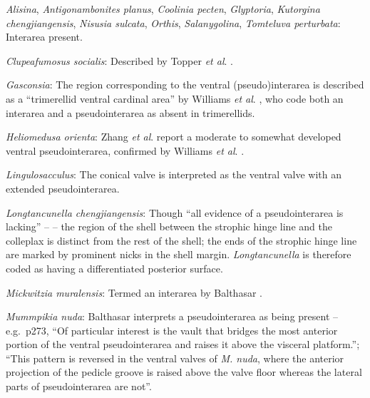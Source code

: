 \documentclass[openany]{book}
\theoremstyle{definition}
\theoremstyle{definition}
\theoremstyle{definition}
\theoremstyle{remark}
\begin{document}
\hypertarget{Alisina-coding-37}{}
\emph{Alisina}, \emph{Antigonambonites planus}, \emph{Coolinia pecten},
\emph{Glyptoria}, \emph{Kutorgina chengjiangensis}, \emph{Nisusia
sulcata}, \emph{Orthis}, \emph{Salanygolina}, \emph{Tomteluva
perturbata}: Interarea present.

\hypertarget{Clupeafumosus_socialis-coding-37}{}
\emph{Clupeafumosus socialis}: Described by Topper \emph{et al}.
\citeyearpar{Topper2013Reappraisalof}.

\hypertarget{Gasconsia-coding-37}{}
\emph{Gasconsia}: The region corresponding to the ventral
(pseudo)interarea is described as a ``trimerellid ventral cardinal
area'' by Williams \emph{et al}.
\citeyearpar[p.162]{Williams2000LinguliformeaCraniiformea}, who code
both an interarea and a pseudointerarea as absent in trimerellids.

\hypertarget{Heliomedusa_orienta-coding-37}{}
\emph{Heliomedusa orienta}: Zhang \emph{et al}.
\citeyearpar{Zhang2009Architectureand} report a moderate to somewhat
developed ventral pseudointerarea, confirmed by Williams \emph{et al}.
\citeyearpar{Williams2007Supplement}.

\hypertarget{Lingulosacculus-coding-37}{}
\emph{Lingulosacculus}: The conical valve is interpreted as the ventral
valve with an extended pseudointerarea.

\hypertarget{Longtancunella_chengjiangensis-coding-37}{}
\emph{Longtancunella chengjiangensis}: Though ``all evidence of a
pseudointerarea is lacking'' -- \citet{Zhang2011Theexceptionally} -- the
region of the shell between the strophic hinge line and the colleplax
\citep[fig. 2 in][]{Zhang2011Theexceptionally} is distinct from the rest
of the shell; the ends of the strophic hinge line are marked by
prominent nicks in the shell margin. \emph{Longtancunella} is therefore
coded as having a differentiated posterior surface.

\hypertarget{Mickwitzia_muralensis-coding-37}{}
\emph{Mickwitzia muralensis}: Termed an interarea by Balthasar
\citeyearpar{Balthasar2004Shellstructure}.

\hypertarget{Mummpikia_nuda-coding-37}{}
\emph{Mummpikia nuda}: Balthasar \citeyearpar{Balthasar2008iMummpikia}
interprets a pseudointerarea as being present -- e.g.~p273, ``Of
particular interest is the vault that bridges the most anterior portion
of the ventral pseudointerarea and raises it above the visceral
platform.''; ``This pattern is reversed in the ventral valves of
\emph{M. nuda}, where the anterior projection of the pedicle groove is
raised above the valve floor whereas the lateral parts of
pseudointerarea are not''.
\end{document}
